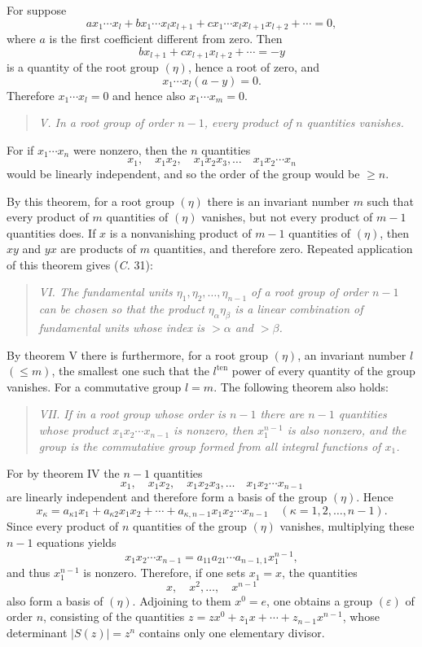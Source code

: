 \documentclass[11pt]{article}
\newcommand{\eps}{\varepsilon}
\newcommand{\ten}{\mathrm{ten}}
\begin{document}
For suppose
\[
 ax_1\cdots x_l+bx_1\cdots x_lx_{l+1}+cx_1\cdots x_lx_{l+1}x_{l+2}+\cdots=0,
\]
where $a$ is the first coefficient different from zero. Then
\[
 bx_{l+1}+cx_{l+1}x_{l+2}+\cdots=-y
\]
is a quantity of the root group $(\eta)$, hence a root of zero, and
\[
 x_1\cdots x_l(a-y)=0.
\]
Therefore $x_1\cdots x_l=0$ and hence also $x_1\cdots x_m=0$.

\begin{quote}\itshape
V. In a root group of order $n-1$, every product of $n$ quantities vanishes.
\end{quote}

For if $x_1\cdots x_n$ were nonzero, then the $n$ quantities
\[
 x_1,
 \quad x_1x_2,
 \quad x_1x_2x_3,
 \ldots
 \quad x_1x_2\cdots x_n
\]
would be linearly independent, and so the order of the group would be $\geq n$.

By this theorem, for a root group $(\eta)$ there is an invariant number $m$ such that every product of $m$ quantities of $(\eta)$ vanishes, but not every product of $m-1$ quantities does. If $x$ is a nonvanishing product of $m-1$ quantities of $(\eta)$, then $xy$ and $yx$ are products of $m$ quantities, and therefore zero. Repeated application of this theorem gives (\emph{C.} 31):

\begin{quote}\itshape
VI. The fundamental units $\eta_1,\eta_2,\ldots,\eta_{n-1}$ of a root group of order $n-1$ can be chosen so that the product $\eta_\alpha\eta_\beta$ is a linear combination of fundamental units whose index is $>\alpha$ and $>\beta$.
\end{quote}

By theorem V there is furthermore, for a root group $(\eta)$, an invariant number $l$ $(\leq m)$, the smallest one such that the $l^{\ten}$ power of every quantity of the group vanishes. For a commutative group $l=m$. The following theorem also holds:

\begin{quote}\itshape
VII. If in a root group whose order is $n-1$ there are $n-1$ quantities whose product $x_1x_2\cdots x_{n-1}$ is nonzero, then $x_1^{n-1}$ is also nonzero, and the group is the commutative group formed from all integral functions of $x_1$.
\end{quote}

For by theorem IV the $n-1$ quantities
\[
 x_1,
 \quad x_1x_2,
 \quad x_1x_2x_3,
 \ldots
 \quad x_1x_2\cdots x_{n-1}
\]
are linearly independent and therefore form a basis of the group $(\eta)$. Hence
\[
 x_\kappa=a_{\kappa1}x_1+a_{\kappa2}x_1x_2+\cdots+a_{\kappa,n-1}x_1x_2\cdots x_{n-1}\quad(\kappa=1,2,\ldots,n-1).
\]
Since every product of $n$ quantities of the group $(\eta)$ vanishes, multiplying these $n-1$ equations yields
\[
 x_1x_2\cdots x_{n-1}=a_{11}a_{21}\cdots a_{n-1,1}x_1^{n-1},
\]
and thus $x_1^{n-1}$ is nonzero. Therefore, if one sets $x_1=x$, the quantities
\[
 x,
\quad x^2,
\ldots,
\quad x^{n-1}
\]
also form a basis of $(\eta)$. Adjoining to them $x^0=e$, one obtains a group $(\eps)$ of order $n$, consisting of the quantities $z=zx^0+z_1x+\cdots+z_{n-1}x^{n-1}$, whose determinant $|S(z)|=z^n$ contains only one elementary divisor.
\end{document}
